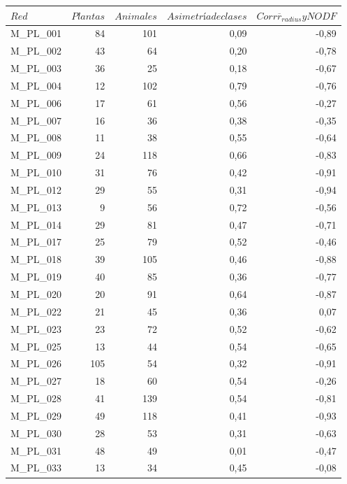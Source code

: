 \begin{table}[ht!]
  \centering
  \tiny
    \begin{tabular}{lrrrr}
    \toprule
    $Red$ & $Plantas$ & $Animales$ & $Asimetría de clases$ & $Corr \overline r_{radius} y NODF$ \\
    \midrule
    M\_PL\_001 & 84   & 101  & 0,09 & -0,89 \\
    M\_PL\_002 & 43   & 64   & 0,20 & -0,78 \\
    M\_PL\_003 & 36   & 25   & 0,18 & -0,67 \\
    M\_PL\_004 & 12   & 102  & 0,79 & -0,76 \\
    M\_PL\_006 & 17   & 61   & 0,56 & -0,27 \\
    M\_PL\_007 & 16   & 36   & 0,38 & -0,35 \\
    M\_PL\_008 & 11   & 38   & 0,55 & -0,64 \\
    M\_PL\_009 & 24   & 118  & 0,66 & -0,83 \\
    M\_PL\_010 & 31   & 76   & 0,42 & -0,91 \\
    M\_PL\_012 & 29   & 55   & 0,31 & -0,94 \\
    M\_PL\_013 & 9    & 56   & 0,72 & -0,56 \\
    M\_PL\_014 & 29   & 81   & 0,47 & -0,71 \\
    M\_PL\_017 & 25   & 79   & 0,52 & -0,46 \\
    M\_PL\_018 & 39   & 105  & 0,46 & -0,88 \\
    M\_PL\_019 & 40   & 85   & 0,36 & -0,77 \\
    M\_PL\_020 & 20   & 91   & 0,64 & -0,87 \\
    M\_PL\_022 & 21   & 45   & 0,36 & 0,07 \\
    M\_PL\_023 & 23   & 72   & 0,52 & -0,62 \\
    M\_PL\_025 & 13   & 44   & 0,54 & -0,65 \\
    M\_PL\_026 & 105  & 54   & 0,32 & -0,91 \\
    M\_PL\_027 & 18   & 60   & 0,54 & -0,26 \\
    M\_PL\_028 & 41   & 139  & 0,54 & -0,81 \\
    M\_PL\_029 & 49   & 118  & 0,41 & -0,93 \\
    M\_PL\_030 & 28   & 53   & 0,31 & -0,63 \\
    M\_PL\_031 & 48   & 49   & 0,01 & -0,47 \\
    M\_PL\_033 & 13   & 34   & 0,45 & -0,08 \\

\end{tabular}
\end{table}

